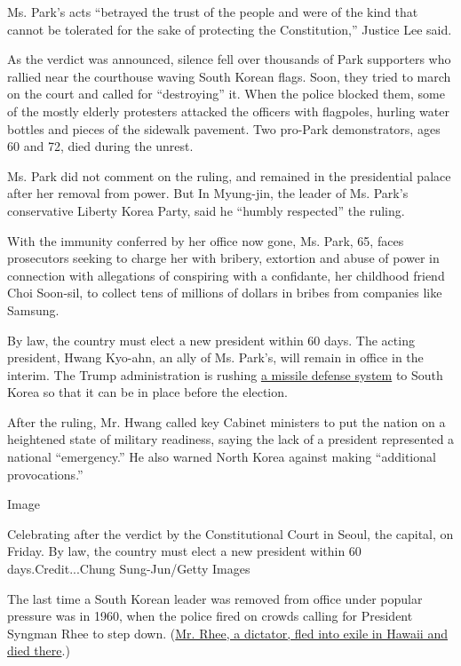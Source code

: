 Ms. Park's acts ``betrayed the trust of the people and were of the kind
that cannot be tolerated for the sake of protecting the Constitution,''
Justice Lee said.

As the verdict was announced, silence fell over thousands of Park
supporters who rallied near the courthouse waving South Korean flags.
Soon, they tried to march on the court and called for ``destroying'' it.
When the police blocked them, some of the mostly elderly protesters
attacked the officers with flagpoles, hurling water bottles and pieces
of the sidewalk pavement. Two pro-Park demonstrators, ages 60 and 72,
died during the unrest.

Ms. Park did not comment on the ruling, and remained in the presidential
palace after her removal from power. But In Myung-jin, the leader of Ms.
Park's conservative Liberty Korea Party, said he ``humbly respected''
the ruling.

With the immunity conferred by her office now gone, Ms. Park, 65, faces
prosecutors seeking to charge her with bribery, extortion and abuse of
power in connection with allegations of conspiring with a confidante,
her childhood friend Choi Soon-sil, to collect tens of millions of
dollars in bribes from companies like Samsung.

By law, the country must elect a new president within 60 days. The
acting president, Hwang Kyo-ahn, an ally of Ms. Park's, will remain in
office in the interim. The Trump administration is rushing
\href{https://www.nytimes3xbfgragh.onion/2017/03/07/world/asia/korea\%2Dmissile\%2Ddefense\%2Dchina\%2Dtrump.html?_r=0}{a
missile defense system} to South Korea so that it can be in place before
the election.

After the ruling, Mr. Hwang called key Cabinet ministers to put the
nation on a heightened state of military readiness, saying the lack of a
president represented a national ``emergency.'' He also warned North
Korea against making ``additional provocations.''

Image

Celebrating after the verdict by the Constitutional Court in Seoul, the
capital, on Friday. By law, the country must elect a new president
within 60 days.Credit...Chung Sung-Jun/Getty Images

The last time a South Korean leader was removed from office under
popular pressure was in 1960, when the police fired on crowds calling
for President Syngman Rhee to step down.
(\href{https://timesmachine.nytimes3xbfgragh.onion/timesmachine/1965/07/20/96708697.html?pageNumber=1}{Mr.
Rhee, a dictator, fled into exile in Hawaii and died there}.)

